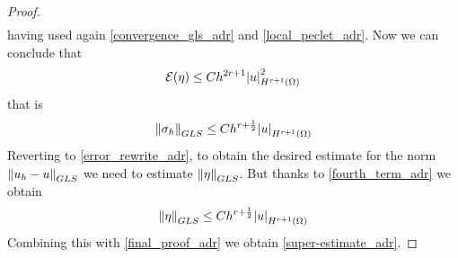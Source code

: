 \begin{proof}
\begin{align*}
    \end{align*}
    having used again \eqref{convergence_gls_adr} and \eqref{local_peclet_adr}. Now we can conclude that 
    \[
        \mathcal{E}(\eta) \leq C h^{2r+1}\abs{u}_{H^{r+1}(\Omega)}^2
    \]
    that is 
    \begin{equation}
        \norm{\sigma_h}_{GLS} \leq C h^{r+\frac{1}{2}}\abs{u}_{H^{r+1}(\Omega)}
        \label{final_proof_adr}
    \end{equation}
    Reverting to \eqref{error_rewrite_adr}, to obtain the desired estimate for the norm \(\norm{u_h-u}_{GLS}\) we need to estimate \(\norm{\eta}_{GLS}\). But thanks to \eqref{fourth_term_adr} we obtain 
    \[
        \norm{\eta}_{GLS} \leq C h^{r+\frac{1}{2}}\abs{u}_{H^{r+1}(\Omega)}
    \]
    Combining this with \eqref{final_proof_adr} we obtain \eqref{super-estimate_adr}.
\end{proof}
